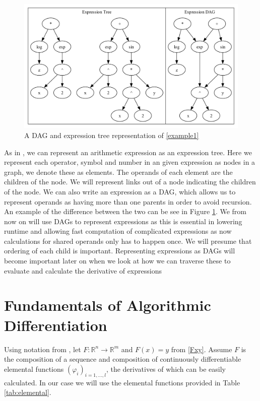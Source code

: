\documentclass{article}
\begin{document}
\begin{figure}[h]
    \centering
    \includegraphics[width=12cm]{images/Graph_Cluster_1.pdf}
    \caption{A DAG and expression tree representation of \eqref{example1}}
    \label{fig:DAGgraph2}
\end{figure}

As in \cite{PoPBook}, we can represent an arithmetic expression as an expression tree. Here we represent each operator, symbol and number in an given expression as nodes in a graph, we denote these as elements. The operands of each element are the children of the node. We will represent links out of a node indicating the children of the node. We can also write an expression as a DAG, which allows us to represent operands as having more than one parents in order to avoid recursion. An example of the difference between the two can be see in Figure \ref{fig:DAGgraph2}. We from now on will use DAGs to represent expressions as this is essential in lowering runtime and allowing fast computation of complicated expressions as now calculations for shared operands only has to happen once. We will presume that ordering of each child is important. Representing expressions as DAGs will become important later on when we look at how we can traverse these to evaluate and calculate the derivative of expressions

\section{Fundamentals of Algorithmic Differentiation}

Using notation from \cite{evald}, let $F: \mathbb{R}^n \rightarrow \mathbb{R}^m$ and $F(x) = y$ from \eqref{Fxy}. Assume $F$ is the composition of a sequence and composition of continuously differentiable elemental functions $(\varphi_i)_{i=1,\ldots, l}$, the derivatives of which can be easily calculated. In our case we will use the elemental functions provided in Table \ref{tab:elemental}.
\end{document}
